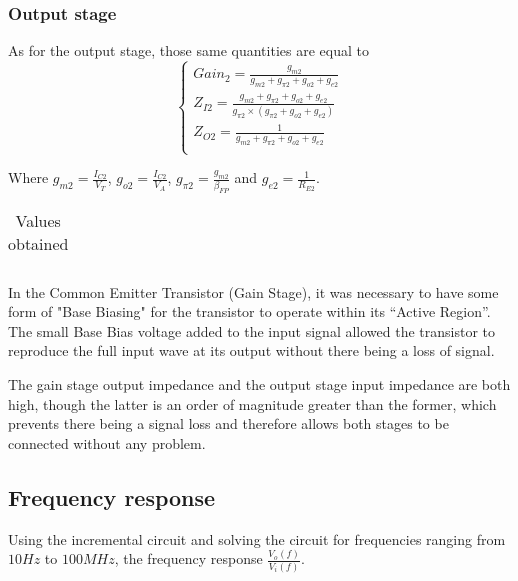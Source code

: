 \subsubsection{Output stage}
As for the output stage, those same quantities are equal to
\begin{equation}
\begin{cases}
Gain_2 = \frac{g_{m2}}{g_{m2}+g_{\pi 2}+g_{o2}+g_{e2}} \\ %
Z_{I2}= \frac{g_{m2}+g_{\pi 2}+g_{o2}+g_{e2}}{g_{\pi 2} \times (g_{\pi 2}+g_{o2}+g_{e2})} \\ %
Z_{O2} = \frac{1}{g_{m2}+g_{\pi 2}+g_{o2}+g_{e2}} \\ %
\end{cases}
\end{equation}

Where $g_{m2} = \frac{I_{C2}}{V_T}$, $g_{o2} = \frac{I_{C2}}{V_A}$, $g_{\pi 2} = \frac{g_{m2}}{\beta_{FP}}$ and $g_{e2} = \frac{1}{R_{E2}}$.

\begin{table}[H]
  \centering
  \begin{tabular}{|c|c|}
    \hline
      
  \end{tabular}
  \caption{Values obtained}
  \label{tab:resultsAC2}
\end{table}

In the Common Emitter Transistor (Gain Stage), it was necessary to have some form of "Base Biasing" for the transistor to operate within its “Active Region”. The small Base Bias voltage added to the input signal allowed the transistor to reproduce the full input wave at its output without there being a loss of signal.

The gain stage output impedance and the output stage input impedance are both high, though the latter is an order of magnitude greater than the former, which prevents there being a signal loss and therefore allows both stages to be connected without any problem.




\subsection{Frequency response}
Using the incremental circuit and solving the circuit for frequencies ranging from $10 Hz$ to $100 MHz$, the frequency response $\frac{V_o(f)}{V_i(f)}$.


